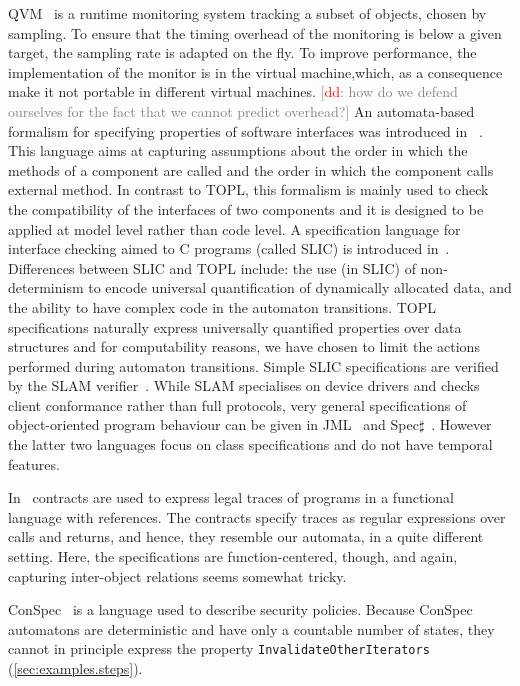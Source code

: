 \documentclass{sigplanconf}[10pt] %
\newcommand{\noterg}[2]{\textcolor{gray}{[\textcolor{red}{#1}: #2]}}
\newcommand{\dd}[1]{\noterg{dd}{#1}}
\begin{document}
QVM~\cite{Arnold:2008} is a runtime monitoring system tracking a subset of objects, chosen by
sampling. To ensure that the timing overhead of the monitoring is below a given target, the sampling rate is 
adapted on the fly.
To improve performance,  the implementation of the monitor is in the virtual machine,which, as a consequence make it not portable in
different virtual machines.
\dd{how do we defend ourselves for the fact that we cannot predict overhead?}
An automata-based formalism for specifying properties of software interfaces was introduced in~\cite{dblp:conf/sigsoft/AlfaroH01} .
This language aims at capturing assumptions about the order in which the methods of a component are called and the order in which the component calls external method.
In contrast to TOPL, this formalism is mainly used to check the compatibility of the interfaces of two components and it is designed to be applied at  model level rather than code level.
A specification language for interface checking aimed to C programs (called SLIC) is introduced in~\cite{ball2002}.
Differences between SLIC and TOPL include: the use (in SLIC) of non-determinism to encode universal quantification of dynamically allocated data, and the  ability to have complex code in the automaton transitions.
TOPL specifications naturally express universally quantified properties over data structures and for computability reasons,  we have chosen to limit the  actions performed during automaton transitions.
Simple SLIC specifications are verified by  the SLAM verifier~\cite{dblp:conf/cav/ballr01}.
While SLAM specialises on device drivers and checks client conformance rather than full protocols,
very general specifications of object-oriented program behaviour can be given in JML~\cite{jml} and Spec$\sharp$~\cite{DBLP:journals/jot/BarnettDFLS04}. However the latter two languages focus on class specifications and do not have temporal features.

In~\cite{disney2011} contracts are used to express legal traces of programs in a functional language with references.
The contracts specify traces as regular expressions over calls and returns, and hence, they resemble our automata, in a quite different setting.
Here, the specifications are function-centered, though, and again, capturing inter-object relations seems somewhat tricky.

ConSpec~\cite{DBLP:journals/entcs/AktugN08} is a language used to describe security policies.
Because ConSpec automatons are deterministic and have only a countable number of states, they cannot in principle express the property \texttt{InvalidateOtherIterators} (\autoref{sec:examples.steps}).
\end{document}
